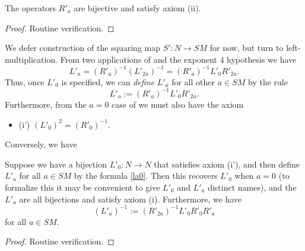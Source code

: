 \begin{lemma}\label{ra-prop}\leanok  The operators $R'_a$ are bijective and satisfy axiom (ii).
\end{lemma}

\begin{proof}\leanok Routine verification.
\end{proof}

We defer construction of the squaring map $S': N \to SM$ for now, but turn to left-multiplication. From two applications of  and the exponent 4 hypothesis we have
$$ L'_a = (R'_a)^{-1} (L'_{2a})^{-1} = (R'_a)^{-1} L'_0 R'_{2a}.$$
Thus, once $L'_0$ is specified, we can \emph{define} $L'_a$ for all other $a \in SM$ by the rule
\begin{equation}\label{la0}
  L'_a := (R'_a)^{-1} L'_0 R'_{2a}.
\end{equation}
Furthermore, from the $a=0$ case of  we must also have the axiom
\begin{itemize}
  \item (i') $(L'_0)^2 = (R'_0)^{-1}$.
\end{itemize}

Conversely, we have

\begin{lemma}\label{l0-la}\leanok  Suppose we have a bijection $L'_0: N \to N$ that satisfies axiom (i'), and then define $L'_a$ for all $a \in SM$ by the formula \eqref{la0}.  Then this recovers $L'_0$ when $a=0$ (to formalize this it may be convenient to give $L'_0$ and $L'_a$ distinct names), and the $L'_a$ are all bijections and satisfy axiom (i).  Furthermore, we have
\begin{equation}\label{la1}
  (L'_a)^{-1} := (R'_{2a})^{-1} L'_0 R'_0 R'_{a}
\end{equation}
for all $a \in SM$.
\end{lemma}

\begin{proof}\leanok Routine verification.
\end{proof}

